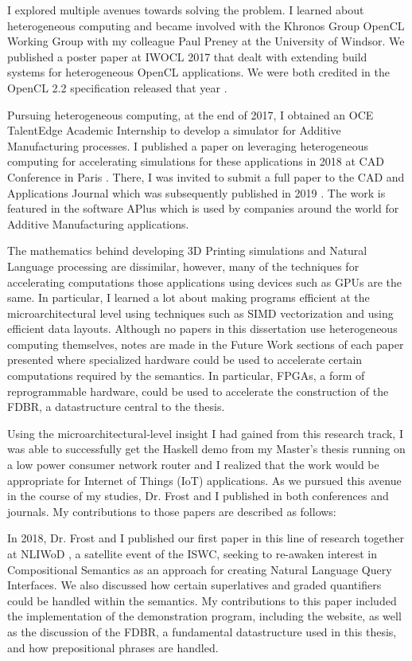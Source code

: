 \documentclass[../main.tex]{subfiles}
\begin{document}
\begin{refsection}
    I explored multiple avenues towards solving the problem.  I learned about heterogeneous computing and became involved with the Khronos Group OpenCL Working Group with my colleague Paul Preney at the University of Windsor.  We published a poster paper at IWOCL 2017 that dealt with extending build systems for heterogeneous OpenCL applications.  We were both credited in the OpenCL 2.2 specification released that year \cite{khronos2018opencl}.

    Pursuing heterogeneous computing, at the end of 2017, I obtained an OCE TalentEdge Academic Internship to develop a simulator for Additive Manufacturing processes.  I published a paper on leveraging heterogeneous computing for accelerating simulations for these applications in 2018 at CAD Conference in Paris \cite{peelar2018toolpath}.  There, I was invited to submit a full paper to the CAD and Applications Journal which was subsequently published in 2019 \cite{peelar2019real}.  The work is featured in the software APlus which is used by companies around the world for Additive Manufacturing applications.

    The mathematics behind developing 3D Printing simulations and Natural Language processing are dissimilar, however, many of the techniques for accelerating computations those applications using devices such as GPUs are the same.  In particular, I learned a lot about making programs efficient at the microarchitectural level using techniques such as SIMD vectorization and using efficient data layouts. Although no papers in this dissertation use heterogeneous computing themselves, notes are made in the Future Work sections of each paper presented where specialized hardware could be used to accelerate certain computations required by the semantics.  In particular, FPGAs, a form of reprogrammable hardware, could be used to accelerate the construction of the FDBR, a datastructure central to the thesis.

    Using the microarchitectural-level insight I had gained from this research track, I was able to successfully get the Haskell demo from my Master's thesis running on a low power consumer network router and I realized that the work would be appropriate for Internet of Things (IoT) applications.
    As we pursued this avenue in the course of my studies, Dr. Frost and I published in both conferences and journals.  My contributions to those papers are described as follows:

    In 2018, Dr. Frost and I published our first paper in this line of research together at NLIWoD \cite{frost2018extensible}, a satellite event of the ISWC, seeking to re-awaken interest in Compositional Semantics as an approach for creating Natural Language Query Interfaces.  We also discussed how certain superlatives and graded quantifiers could be handled within the semantics.  My contributions to this paper included the implementation of the demonstration program, including the website, as well as the discussion of the FDBR, a fundamental datastructure used in this thesis, and how prepositional phrases are handled.


\end{refsection}
\end{document}
